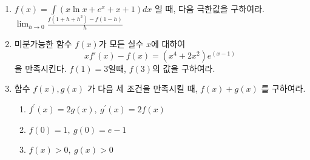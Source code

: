 \documentclass[12pt, a4paper]{article}
\begin{document}
\begin{enumerate}
\item $f(x)=\int(x \ln x+e^{x}+x+1)dx$ 일 때, 다음 극한값을 구하여라.
    $\displaystyle \lim_{h\rightarrow0}\frac{f(1+h+h^{2})-f(1-h)}{h}$

\item 미분가능한 함수 $f(x)$가 모든 실수 $x$에 대하여 
\[xf'(x)-f(x)=(x^4+2x^2)e^(x-1)\]을 만족시킨다. $f(1)=3$일때, $f(3)$의 값을 구하여라.

\item 함수 $f(x), g(x)$ 가 다음 세 조건을 만족시킬 때, $f(x)+g(x)$ 를 구하여라.
\begin{enumerate}[label=(\text{\roman*}), leftmargin=10mm, nosep]
    \item $f^{\prime}(x)=2g(x), \ g^{\prime}(x)=2f(x)$
    \item $f(0)=1, \ g(0)=e-1$
    \item $f(x)>0, \ g(x)>0$    
\end{enumerate}

\end{enumerate}
\end{document}
